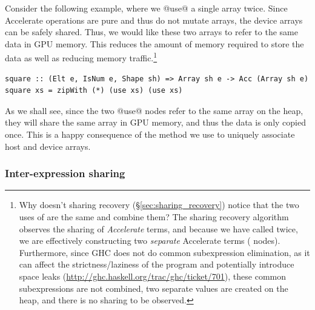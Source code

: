Consider the following example, where we @use@ a single array twice. Since
Accelerate operations are pure and thus do not mutate arrays, the device arrays
can be safely shared. Thus, we would like these two arrays to refer to the same
data in GPU memory. This reduces the amount of memory required to store the
data as well as reducing memory traffic.\footnote{Why doesn't sharing recovery
(\S\ref{sec:sharing_recovery}) notice that the two uses of  are
the same and combine them? The sharing recovery algorithm observes the sharing
of \emph{Accelerate} terms, and because we have called  twice, we
are effectively constructing two \emph{separate} Accelerate terms
( nodes). Furthermore, since GHC does not do common subexpression
elimination, as it can affect the strictness/laziness of the program and
potentially introduce space leaks
(\url{http://ghc.haskell.org/trac/ghc/ticket/701}), these common subexpressions
are not combined, two separate values are created on the heap, and there is no
sharing to be observed.}
%
\begin{lstlisting}[style=haskell]
square :: (Elt e, IsNum e, Shape sh) => Array sh e -> Acc (Array sh e)
square xs = zipWith (*) (use xs) (use xs)
\end{lstlisting}

As we shall see, since the two @use@ nodes refer to the same array on the heap,
they will share the same array in GPU memory, and thus the data is only copied
once. This is a happy consequence of the method we use to uniquely associate
host and device arrays.

\subsubsection{Inter-expression sharing}

